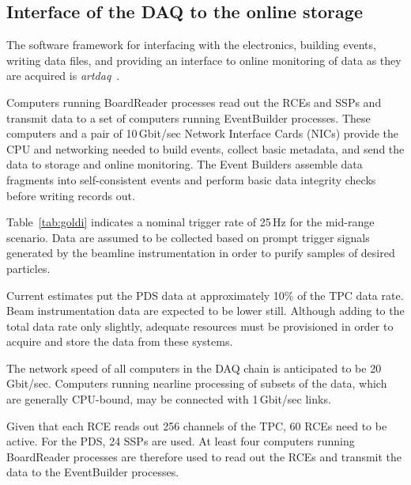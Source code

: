 \subsection{Interface of the DAQ to the online storage}
\label{sec:DAQ_online_interface}

The software framework for
interfacing with the electronics, building events, writing data files,
and providing an interface to online monitoring of data as they are
acquired is \textit{artdaq}~\cite{artdaq}. 

Computers running BoardReader processes read out
the RCEs and SSPs and transmit data to a set of computers running EventBuilder processes.
These computers and a
pair of 10\,Gbit/sec Network Interface Cards (NICs) provide the CPU and networking needed to
build events, collect basic metadata, and send the data to storage and
online monitoring.  The Event Builders assemble data fragments into self-consistent events and perform basic data integrity checks before writing records out.


Table~\ref{tab:goldi} indicates a nominal trigger rate of 25\,Hz for
the mid-range scenario. 
 Data are assumed to be
collected based on prompt trigger signals generated by the beamline
instrumentation in order to purify samples of desired particles.

Current estimates put the PDS data at approximately 10\% 
of the TPC data rate.  Beam instrumentation data are expected to be lower still.
Although adding to the
total data rate only slightly, adequate resources must
be provisioned in order to acquire and store the data from these
systems.  

The network speed of all computers in the DAQ
chain is anticipated to be 20\,Gbit/sec. 
 Computers running nearline
processing of subsets of the data, which are generally CPU-bound, may
be connected with 1\,Gbit/sec links.  


Given that each RCE reads out 256 channels of the TPC, 60 RCEs
need to be active.  For the PDS, 24 SSPs are used.  At least four computers 
running BoardReader processes are therefore used to read out
the RCEs and transmit the data to the EventBuilder processes.

